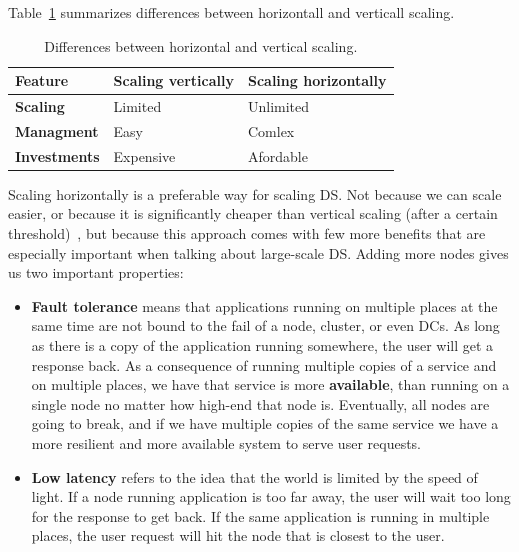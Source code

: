\noindent
Table~\ref{tab:table1} summarizes differences between horizontall and verticall scaling.

\begin{table}[h!]
	\begin{center}
		\begin{tabular}{l|l|l}
			\textbf{Feature} & \textbf{Scaling vertically} & \textbf{Scaling horizontally}\\
			\hline
			\textbf{Scaling} & Limited & Unlimited \\
			\textbf{Managment} & Easy & Comlex\\
			\textbf{Investments} & Expensive & Afordable \\
		\end{tabular}
	\end{center}
	\vspace{-0.5cm}
	\caption{Differences between horizontal and vertical scaling.}
	\label{tab:table1}
\end{table}

\noindent
Scaling horizontally is a preferable way for scaling DS. Not because we can scale easier, or because it is significantly cheaper than vertical scaling (after a certain threshold)~\cite{Bondi00}, but because this approach comes with few more benefits that are especially important when talking about large-scale DS. Adding more nodes gives us two important properties: 

\begin{itemize}
	\item \textbf{Fault tolerance} means that applications running on multiple places at the same time are not bound to the fail of a node, cluster, or even DCs. As long as there is a copy of the application running somewhere, the user will get a response back. As a consequence of running multiple copies of a service and on multiple places, we have that service is more \textbf{available}, than running on a single node no matter how high-end that node is. Eventually, all nodes are going to break, and if we have multiple copies of the same service we have a more resilient and more available system to serve user requests.
	\item \textbf{Low latency} refers to the idea that the world is limited by the speed of light. If a node running application is too far away, the user will wait too long for the response to get back. If the same application is running in multiple places, the user request will hit the node that is closest to the user.
\end{itemize}

